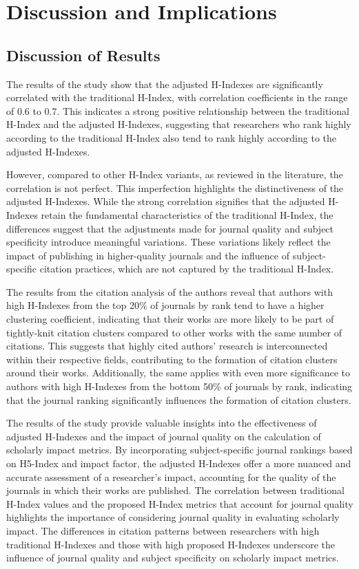 \chapter{Discussion and Implications}
\label{ch:discussion}

\section{Discussion of Results}

The results of the study show that the adjusted H-Indexes are significantly
correlated with the traditional H-Index, with correlation coefficients in the
range of 0.6 to 0.7. This indicates a strong positive relationship between the
traditional H-Index and the adjusted H-Indexes, suggesting that researchers who
rank highly according to the traditional H-Index also tend to rank highly
according to the adjusted H-Indexes.

However, compared to other H-Index variants, as reviewed in the literature, the
correlation is not perfect. This imperfection highlights the distinctiveness of
the adjusted H-Indexes. While the strong correlation signifies that the
adjusted H-Indexes retain the fundamental characteristics of the traditional
H-Index, the differences suggest that the adjustments made for journal quality
and subject specificity introduce meaningful variations. These variations
likely reflect the impact of publishing in higher-quality journals and the
influence of subject-specific citation practices, which are not captured by the
traditional H-Index.

The results from the citation analysis of the authors reveal that authors with
high H-Indexes from the top 20\% of journals by rank tend to have a higher
clustering coefficient, indicating that their works are more likely to be part
of tightly-knit citation clusters compared to other works with the same number
of citations. This suggests that highly cited authors' research is
interconnected within their respective fields, contributing to the formation of
citation clusters around their works. Additionally, the same applies with even
more significance to authors with high H-Indexes from the bottom 50\% of
journals by rank, indicating that the journal ranking significantly influences
the formation of citation clusters.

The results of the study provide valuable insights into the effectiveness of
adjusted H-Indexes and the impact of journal quality on the calculation of
scholarly impact metrics. By incorporating subject-specific journal rankings
based on H5-Index and impact factor, the adjusted H-Indexes offer a more
nuanced and accurate assessment of a researcher's impact, accounting for the
quality of the journals in which their works are published. The correlation
between traditional H-Index values and the proposed H-Index metrics that
account for journal quality highlights the importance of considering journal
quality in evaluating scholarly impact. The differences in citation patterns
between researchers with high traditional H-Indexes and those with high
proposed H-Indexes underscore the influence of journal quality and subject
specificity on scholarly impact metrics.

